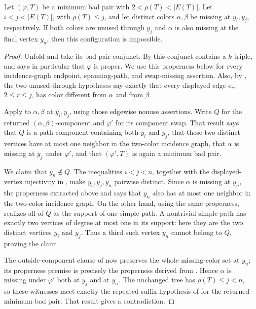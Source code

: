 \begin{helper}
Let \((\varphi,T)\) be a minimum bad pair with
\(2<\rho(T)<|E(T)|\).  Let \(i<j<|E(T)|\), with
\(\rho(T)\le j\), and let distinct colors \(\alpha,\beta\) be missing
at \(y_i,y_j\), respectively.  If both colors are unused through
\(y_j\) and \(\alpha\) is also missing at the final vertex \(y_n\),
then this configuration is impossible.
\end{helper}
\begin{proof}
Unfold  and take its bad-pair
conjunct.  By  this conjunct contains a
\(k\)-triple, and  says in particular that
\(\varphi\) is proper.  We use this properness below for every
incidence-graph endpoint, spanning-path, and swap-missing assertion.
Also, by , the two unused-through
hypotheses say exactly that every displayed edge \(e_r\),
\(2\le r\le j\), has color different from \(\alpha\) and from
\(\beta\).

Apply  to \(\alpha,\beta\) at
\(y_i,y_j\), using those edgewise nonuse assertions.  Write \(Q\) for the returned
\((\alpha,\beta)\)-component and \(\varphi'\) for its component swap.
That result says that \(Q\) is a path component containing both
\(y_i\) and \(y_j\), that these two distinct vertices have at most one
neighbor in the two-color incidence graph, that \(\alpha\) is missing
at \(y_j\) under \(\varphi'\), and that \((\varphi',T)\) is again a
minimum bad pair.

We claim that \(y_n\notin Q\).  The inequalities
\(i<j<n\), together with the displayed-vertex injectivity in
, make \(y_i,y_j,y_n\) pairwise distinct.  Since
\(\alpha\) is missing at \(y_n\), the properness extracted above and
 says that \(y_n\) also has at
most one neighbor in the two-color incidence graph.  On the other hand,
using the same properness, 
realizes all of \(Q\) as the
support of one simple path.  A nontrivial simple path has exactly two
vertices of degree at most one in its support: here they are the two
distinct vertices \(y_i\) and \(y_j\).  Thus a third such vertex
\(y_n\) cannot belong to \(Q\), proving the claim.

The outside-component clause of
 now preserves the whole
missing-color set at \(y_n\); its properness premise is precisely the
properness derived from .  Hence \(\alpha\) is missing under
\(\varphi'\) both at \(y_j\) and at \(y_n\).  The unchanged tree has
\(\rho(T)\le j<n\), so these witnesses meet exactly the repeated suffix
hypothesis of  for the returned
minimum bad pair.  That result gives a contradiction.
\end{proof}
